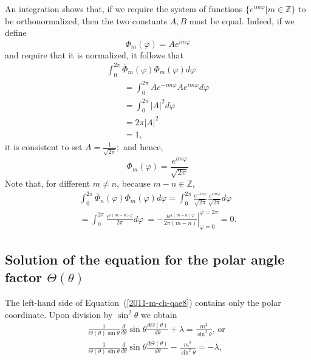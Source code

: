 An integration shows that, if we require the system of functions $\{e^{im\varphi}\vert m \in \mathbb{Z}\}$
to be orthonormalized, then the two constants $A,B$ must be equal.
Indeed, if we define
\begin{equation}
\Phi_m(\varphi) = Ae^{im\varphi}
\label{2011-m-ch-qae11def}
\end{equation}
and require that it is normalized, it follows that
\begin{equation}
\begin{split}
\int_0^{2\pi} \overline {\Phi}_m(\varphi) \Phi_m(\varphi)d \varphi \\
\qquad     =
\int_0^{2\pi} \overline {A}e^{-im\varphi}Ae^{im\varphi} d \varphi \\
\qquad    =
\int_0^{2\pi}\vert A\vert^2 d \varphi \\
\qquad  = 2\pi  \vert A\vert^2  \\
\qquad
= 1,
\end{split}
\label{2011-m-ch-qae11normexpl}
\end{equation}
it is consistent to set
$
A= \frac{1} {\sqrt{2\pi } };
$
and hence,
\begin{equation}
\Phi_m(\varphi) = \frac{e^{im\varphi}} {\sqrt{2\pi }  }
\label{2011-m-ch-qae11normexplnendg}
\end{equation}
Note that, for different $m\neq n$, because $m-n\in \mathbb{Z}$,
\begin{equation}
\begin{split}
\int_0^{2\pi} \overline {\Phi}_n(\varphi) \Phi_m(\varphi)d \varphi
  =
\int_0^{2\pi} \frac{e^{-in\varphi}} {\sqrt{2\pi }  } \frac{e^{im\varphi}} {\sqrt{2\pi }}  d \varphi \\
  =
\int_0^{2\pi} \frac{e^{i(m-n)\varphi}} { 2\pi  }   d \varphi \
  =
\left. -\frac{i e^{i(m-n)\varphi}} { 2\pi (m-n) } \right|_{\varphi =0}^{\varphi = 2\pi}  = 0
.
\end{split}
\label{2011-m-ch-qae11normexplnoni}
\end{equation}


\subsection{Solution of the equation  for the  polar angle factor $\Theta (\theta )$}

The left-hand side of
Equation~(\ref{2011-m-ch-qae8}) contains only the polar coordinate.
Upon division by $\sin ^2 \theta$ we obtain
\begin{equation}
\begin{split}
\frac{1}{\Theta(\theta)\sin \theta}
\frac{   d   }{   d    \theta }
\sin \theta \frac{   d    \Theta(\theta)}{   d    \theta }
+  \lambda
= \frac{m^2}{\sin^2\theta}\textrm{, or }\\
\frac{1}{\Theta(\theta)\sin \theta}
\frac{   d   }{   d    \theta }
\sin \theta \frac{   d    \Theta(\theta)}{   d    \theta }   -\frac{m^2}{\sin^2\theta }
= -  \lambda    ,\\
\end{split}
\label{2011-m-ch-pcde}
\end{equation}

